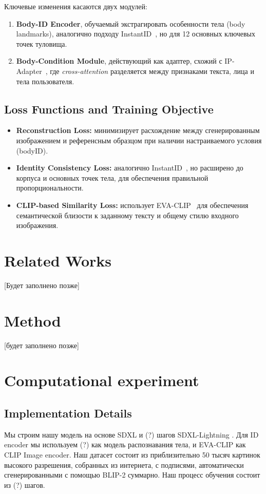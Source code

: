 \documentclass[a4paper,14pt]{article}
\theoremstyle{plain} %
\theoremstyle{definition} %
\theoremstyle{remark} %
\begin{document}
		Ключевые изменения касаются двух модулей:
		\begin{enumerate}
			\item \textbf{Body-ID Encoder}, обучаемый экстрагировать особенности тела (body landmarks), аналогично подходу InstantID~\cite{wang2024instantid}, но для 12 основных ключевых точек туловища.
			\item \textbf{Body-Condition Module}, действующий как адаптер, схожий с IP-Adapter~\cite{ye2023ip-adapter}, где \textit{cross-attention} разделяется между признаками текста, лица и тела пользователя.
		\end{enumerate}

		\subsection{Loss Functions and Training Objective}
		\begin{itemize}
			\item \textbf{Reconstruction Loss:} минимизирует расхождение между сгенерированным изображением и референсным образцом при наличии настраиваемого условия (bodyID).
			\item \textbf{Identity Consistency Loss:} аналогично InstantID~\cite{wang2024instantid}, но расширено до корпуса и основных точек тела, для обеспечения правильной пропорциональности.
			\item \textbf{CLIP-based Similarity Loss:} использует EVA-CLIP~\cite{sun2023evaclipimprovedtrainingtechniques} для обеспечения семантической близости к заданному тексту и общему стилю входного изображения.
		\end{itemize}

	\section{Related Works}
		[Будет заполнено позже]

	\section{Method}
		[будет заполнено позже]

	\section{Computational experiment}
	\subsection{Implementation Details}
		Мы строим нашу модель на основе SDXL \citep{podell2023sdxlimprovinglatentdiffusion} и (?) шагов SDXL-Lightning \citep{lin2024-sdxllightning}. Для ID encoder мы используем (?)
		как модель распознавания тела, и EVA-CLIP \citep{sun2023evaclipimprovedtrainingtechniques} как CLIP Image encoder. Наш датасет состоит из приблизительно 50 тысяч картинок
		высокого разрешения, собранных из интернета, с подписями, автоматически сгенерированными с помощью BLIP-2 \citep{pmlr-v202-li23q} суммарно. Наш процесс обучения состоит из (?) шагов.
\end{document}

